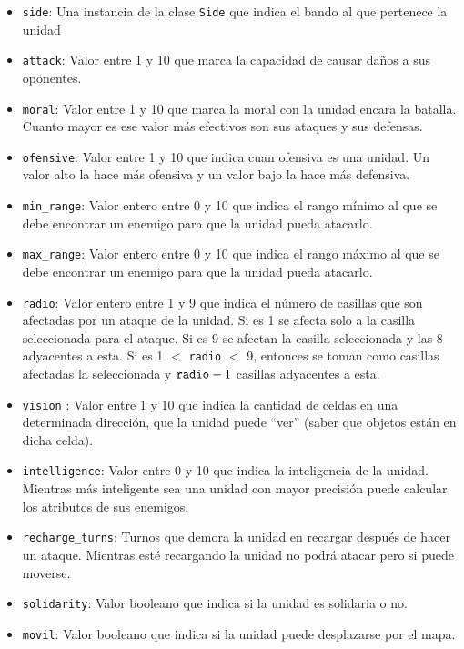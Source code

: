 \begin{itemize}
	\item \verb|side|: Una instancia de la clase \verb|Side| que indica el bando al que pertenece la unidad
	\item \verb|attack|: Valor entre 1 y 10 que marca la capacidad de causar da\~{n}os a sus oponentes.
	\item \verb|moral|: Valor entre 1 y 10 que marca la moral con la unidad encara la batalla. Cuanto mayor es ese valor m\'as efectivos son sus ataques y sus defensas.
	\item \verb|ofensive|: Valor entre 1 y 10 que indica cuan ofensiva es una unidad. Un valor alto la hace m\'as ofensiva y un valor bajo la hace m\'as defensiva.
	\item \verb|min_range|: Valor entero entre 0 y 10 que indica el rango m\'inimo al que se debe encontrar un enemigo para que la unidad pueda atacarlo.
	\item \verb|max_range|: Valor entero entre 0 y 10 que indica el rango m\'aximo al que se debe encontrar un enemigo para que la unidad pueda atacarlo.
	\item \verb|radio|: Valor entero entre 1 y 9 que indica el n\'umero de casillas que son afectadas por un ataque de la unidad. Si es 1 se afecta solo a la casilla seleccionada para el ataque. Si es 9 se afectan la casilla seleccionada y las 8 adyacentes a esta. Si es 1 $<$ \verb|radio| $<$ 9, entonces se toman como casillas afectadas la seleccionada y $\verb|radio|-1$ casillas adyacentes a esta.
	\item \verb|vision| : Valor entre 1 y 10 que indica la cantidad de celdas en una determinada direcci\'on, que la unidad puede ``ver'' (saber que objetos est\'an en dicha celda).   
	\item \verb|intelligence|: Valor entre 0 y 10 que indica la inteligencia de la unidad. Mientras m\'as inteligente sea una unidad con mayor precisi\'on puede calcular los atributos de sus enemigos.
	\item \verb|recharge_turns|: Turnos que demora la unidad en recargar despu\'es de hacer un ataque. Mientras est\'e recargando la unidad no podr\'a atacar pero si puede moverse.
	\item \verb|solidarity|: Valor booleano que indica si la unidad es solidaria o no.
	\item \verb|movil|: Valor booleano que indica si la unidad puede desplazarse por el mapa.  
\end{itemize}

